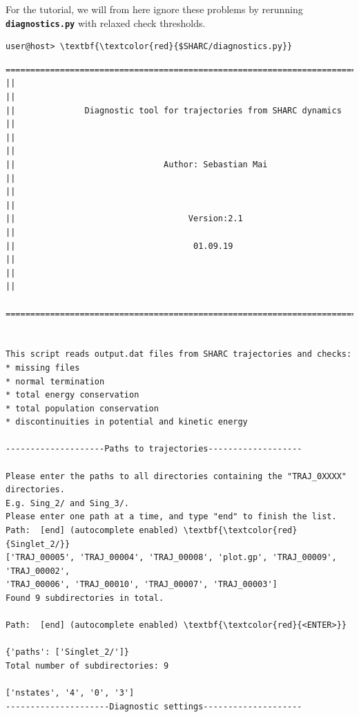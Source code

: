 \documentclass[a4paper,11pt,DIV=15,openany]{scrbook}
\newcommand{\ttt}[1]{\textbf{\texttt{#1}}}
\begin{document}
For the tutorial, we will from here ignore these problems by rerunning \ttt{diagnostics.py} with relaxed check thresholds.

\begin{Verbatim}[commandchars=\\\{\}]
user@host> \textbf{\textcolor{red}{$SHARC/diagnostics.py}}
\end{Verbatim}


\begin{oframed}
\footnotesize\begin{Verbatim}[commandchars=\\\{\}]
  ================================================================================
||                                                                                ||
||              Diagnostic tool for trajectories from SHARC dynamics              ||
||                                                                                ||
||                              Author: Sebastian Mai                             ||
||                                                                                ||
||                                   Version:2.1                                  ||
||                                    01.09.19                                    ||
||                                                                                ||
  ================================================================================


This script reads output.dat files from SHARC trajectories and checks:
* missing files
* normal termination
* total energy conservation
* total population conservation
* discontinuities in potential and kinetic energy
  
--------------------Paths to trajectories-------------------

Please enter the paths to all directories containing the "TRAJ_0XXXX" directories.
E.g. Sing_2/ and Sing_3/. 
Please enter one path at a time, and type "end" to finish the list.
Path:  [end] (autocomplete enabled) \textbf{\textcolor{red}{Singlet_2/}}
['TRAJ_00005', 'TRAJ_00004', 'TRAJ_00008', 'plot.gp', 'TRAJ_00009', 'TRAJ_00002', 
'TRAJ_00006', 'TRAJ_00010', 'TRAJ_00007', 'TRAJ_00003']
Found 9 subdirectories in total.

Path:  [end] (autocomplete enabled) \textbf{\textcolor{red}{<ENTER>}}

{'paths': ['Singlet_2/']}
Total number of subdirectories: 9

['nstates', '4', '0', '3']
---------------------Diagnostic settings--------------------


\end{Verbatim}
\end{oframed}
\end{document}
